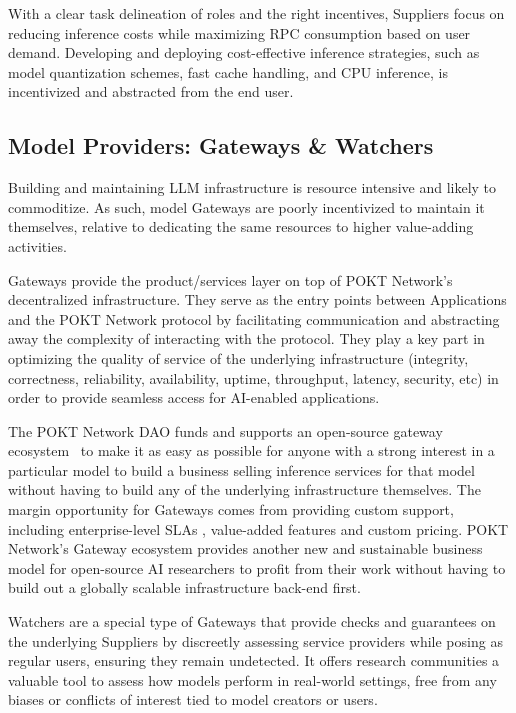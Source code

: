 \documentclass[conference,compsoc]{IEEEtran}
\begin{document}
With a clear task delineation of roles and the right incentives, Suppliers focus on reducing inference costs while maximizing RPC consumption based on user demand. Developing and deploying cost-effective inference strategies, such as model quantization schemes, fast cache handling, and CPU inference, is incentivized and abstracted from the end user.

\subsection{Model Providers: Gateways \& Watchers}

Building and maintaining LLM infrastructure is resource intensive and likely to commoditize. As such, model Gateways are poorly incentivized to maintain it themselves, relative to dedicating the same resources to higher value-adding activities.

Gateways provide the product/services layer on top of POKT Network’s decentralized infrastructure. They serve as the entry points between Applications and the POKT Network protocol by facilitating communication and abstracting away the complexity of interacting with the protocol. They play a key part in optimizing the quality of service of the underlying infrastructure (integrity, correctness, reliability, availability, uptime, throughput, latency, security, etc) in order to provide seamless access for AI-enabled applications.

The POKT Network DAO funds and supports an open-source gateway ecosystem~\cite{poktGatewayServer} to make it as easy as possible for anyone with a strong interest in a particular model to build a business selling inference services for that model without having to build any of the underlying infrastructure themselves. The margin opportunity for Gateways comes from providing custom support, including enterprise-level SLAs \cite{groveSLA}, value-added features and custom pricing. POKT Network’s Gateway ecosystem provides another new and sustainable business model for open-source AI researchers to profit from their work without having to build out a globally scalable infrastructure back-end first.

Watchers are a special type of Gateways that provide checks and guarantees on the underlying Suppliers by discreetly assessing service providers while posing as regular users, ensuring they remain undetected. It offers research communities a valuable tool to assess how models perform in real-world settings, free from any biases or conflicts of interest tied to model creators or users.
\end{document}
